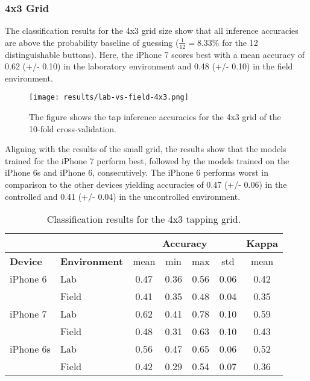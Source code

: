 \subsubsection{4x3 Grid}

The classification results for the 4x3 grid size show that all inference accuracies are above the probability baseline of guessing ($\frac{1}{12}= 8.33\%$ for the 12 distinguishable buttons). Here, the iPhone 7 scores best with a mean accuracy of 0.62 (+/- 0.10) in the laboratory environment and 0.48 (+/- 0.10) in the field environment.

\begin{figure}[h!]
  \centering
  \texttt{[image: results/lab-vs-field-4x3.png]}
  \caption{The figure shows the tap inference accuracies for the 4x3 grid of the 10-fold cross-validation.} \label{fig:participation}
\end{figure}

Aligning with the results of the small grid, the results show that the models trained for the iPhone 7 perform best, followed by the models trained on the iPhone 6s and iPhone 6, consecutively. The iPhone 6 performs worst in comparison to the other devices yielding accuracies of 0.47 (+/- 0.06) in the controlled and 0.41 (+/- 0.04) in the uncontrolled environment.

\begin{table}[h!]
  \centering
\begin{tabular}{|l|l|c|c|c|c|c|}
  \cline{3-7}
  \multicolumn{2}{c}{} & \multicolumn{4}{|c|}{\textbf{Accuracy}} & \textbf{Kappa} \\
  \hline
  \textbf{Device} & \textbf{Environment} & mean &   min &   max  & std &  mean \\
  \hline
  iPhone 6 & Lab &      0.47 &     0.36 &     0.56 &     0.06 &        0.42 \\
  & Field &      0.41 &     0.35 &     0.48 &     0.04 &        0.35 \\
  \hline
iPhone 7 & Lab &      0.62 &     0.41 &     0.78 &     0.10 &        0.59 \\
  & Field &      0.48 &     0.31 &     0.63 &     0.10 &        0.43 \\
  \hline
iPhone 6s & Lab &      0.56 &     0.47 &     0.65 &     0.06 &        0.52 \\
  & Field &      0.42 &     0.29 &     0.54 &     0.07 &        0.36 \\
  \hline
\end{tabular}
  \caption{Classification results for the 4x3 tapping grid.}
\end{table}

